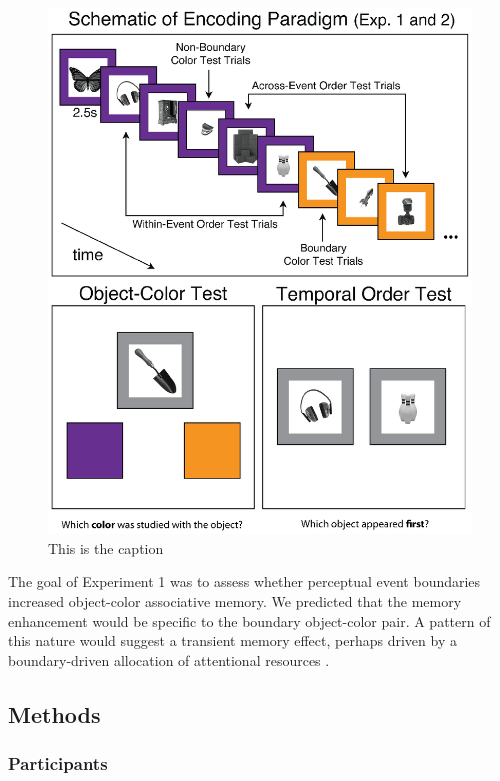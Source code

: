 \begin{figure}[htbp]
\centering
\includegraphics{figures/chapter1_figure1}
\caption{This is the caption}
\end{figure}

The goal of Experiment 1 was to assess whether perceptual event
boundaries increased object-color associative memory. We predicted that
the memory enhancement would be specific to the boundary object-color
pair. A pattern of this nature would suggest a transient memory effect,
perhaps driven by a boundary-driven allocation of attentional resources
\autocite{kurby_segmentation_2008}.

\subsection{Methods}\label{methods}

\subsubsection{Participants}\label{participants}

